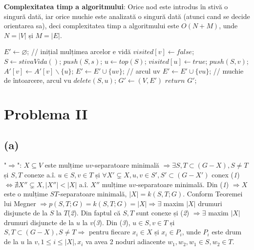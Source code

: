 \documentclass[a4paper,12pt]{article}
\begin{document}
\textbf{Complexitatea timp a algoritmului}: Orice nod este introdus în stivă o singură dată, iar orice muchie este analizată o singură dată (atunci cand se decide orientarea sa), deci complexitatea timp a algoritmului este $O(N+M)$, unde $N=|V|$ și $M=|E|$.

\begin{algorithm}
	\begin{algorithmic}[1]
		\State $E' \gets \varnothing$; // inițial mulțimea arcelor e vidă
			\State $visited[v] \gets false$;
		\EndFor
		\State $S \gets stivaVida()$;
		\State $push(S,s)$;
			\State $ u \gets top(S)$;
			\State $ visited[u] \gets true$;
					\State $push(S,v)$;
					\State $A'[v] \gets A'[v] \backslash \{u\}$;
					\State $E' \gets E' \cup \{uv\}$; // arcul uv
				\Else
					\State $E' \gets E' \cup \{vu\}$; // muchie de întoarcere, arcul vu
				\EndIf
			\Else
				\State $delete(S,u)$;
			\EndIf
		\EndWhile
		\State $G' \gets (V,E')$
		\State $return$ $G'$;
	\end{algorithmic}
\end{algorithm}	

\section{Problema II}

\subsection{(a)}

"$\Rightarrow$": $X \subseteq V$ este  mulțime $uv$-separatoare minimală $\Rightarrow \exists S,T \subset (G-X), S \neq T$ și $S,T$ conexe a.î. $u \in S, v \in T$ și $\forall X' \subsetneq X, u,v \in S', S' \subset (G-X')$ conex ({\itshape1})$\Leftrightarrow \nexists X'' \subsetneq X, |X''| < |X|$ a.î. $X''$ mulțime $uv$-separatoare minimală. Din ({\itshape1}) $\Rightarrow X$ este o mulțime $ST$-separatoare minimală, $|X| = k(S,T;G)$. Conform Teoremei lui Megner $\Rightarrow p(S,T;G)=k(S,T;G) = |X| \Rightarrow \exists$ maxim $|X|$ drumuri disjuncte de la $S$ la $T$({\itshape2}). Din faptul că $S,T$ sunt conexe și ({\itshape2}) $\Rightarrow \exists$ maxim $|X|$ drumuri disjuncte de la $u$ la $v$({\itshape3}). Din ({\itshape3}), $u \in S,v \in T$ și $S,T \subset (G-X), S \neq T \Rightarrow$ pentru fiecare $x_i \in X$ și $x_i \in P_i$, unde $P_i$ este drum de la $u$ la $v, 1 \leq i \leq |X|, x_i$ va avea 2 noduri adiacente $w_1,w_2,w_1 \in S, w_2 \in T$.
\end{document}
